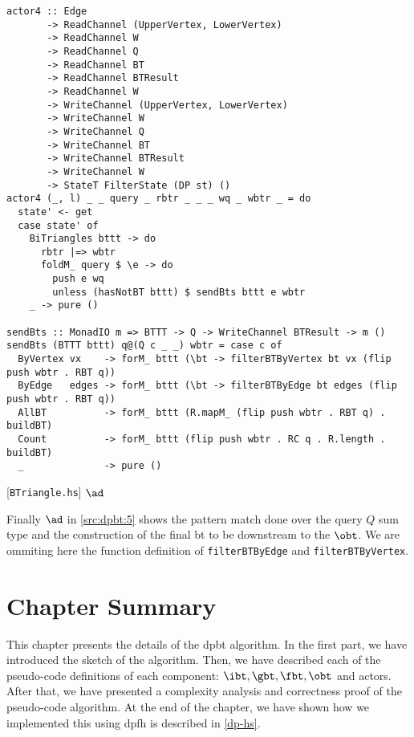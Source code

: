 \begin{listing}[H]
\begin{verbatim}            
actor4 :: Edge
       -> ReadChannel (UpperVertex, LowerVertex)
       -> ReadChannel W
       -> ReadChannel Q
       -> ReadChannel BT
       -> ReadChannel BTResult
       -> ReadChannel W
       -> WriteChannel (UpperVertex, LowerVertex)
       -> WriteChannel W
       -> WriteChannel Q
       -> WriteChannel BT
       -> WriteChannel BTResult
       -> WriteChannel W
       -> StateT FilterState (DP st) ()
actor4 (_, l) _ _ query _ rbtr _ _ _ wq _ wbtr _ = do
  state' <- get
  case state' of
    BiTriangles bttt -> do
      rbtr |=> wbtr
      foldM_ query $ \e -> do
        push e wq
        unless (hasNotBT bttt) $ sendBts bttt e wbtr
    _ -> pure ()

sendBts :: MonadIO m => BTTT -> Q -> WriteChannel BTResult -> m ()
sendBts (BTTT bttt) q@(Q c _ _) wbtr = case c of
  ByVertex vx    -> forM_ bttt (\bt -> filterBTByVertex bt vx (flip push wbtr . RBT q))
  ByEdge   edges -> forM_ bttt (\bt -> filterBTByEdge bt edges (flip push wbtr . RBT q))
  AllBT          -> forM_ bttt (R.mapM_ (flip push wbtr . RBT q) . buildBT)
  Count          -> forM_ bttt (flip push wbtr . RC q . R.length . buildBT)
  _              -> pure ()
\end{verbatim}
\caption{[\texttt{BTriangle.hs}] $\ad$}
\label{src:dpbt:5}
\end{listing}

Finally $\ad$ in \autoref{src:dpbt:5} shows the pattern match done over the query $Q$ sum type and the construction
of the final \acrshort{bt} to be downstream to the $\obt$. We are ommiting here the function definition of \texttt{filterBTByEdge}
and \texttt{filterBTByVertex}.

\section{Chapter Summary}
This chapter presents the details of the \acrshort{dpbt} algorithm. In the first part, we have introduced the sketch of the algorithm.
Then, we have described each of the pseudo-code definitions of each component: $\ibt, \gbt, \fbt, \obt$ and actors. 
After that, we have presented a complexity analysis and correctness proof of the pseudo-code algorithm.
At the end of the chapter, we have shown how we implemented this using \acrshort{dpfh} is described in \autoref{dp-hs}.


